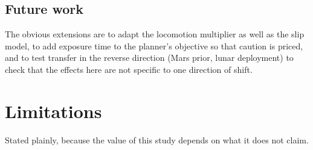\documentclass[11pt]{article}
\begin{document}
\subsection{Future work}

The obvious extensions are to adapt the locomotion multiplier as well as the
slip model, to add exposure time to the planner's objective so that caution is
priced, and to test transfer in the reverse direction (Mars prior, lunar
deployment) to check that the effects here are not specific to one direction of
shift.

\section{Limitations}
\label{sec:limitations}

Stated plainly, because the value of this study depends on what it does not
claim.
\end{document}
